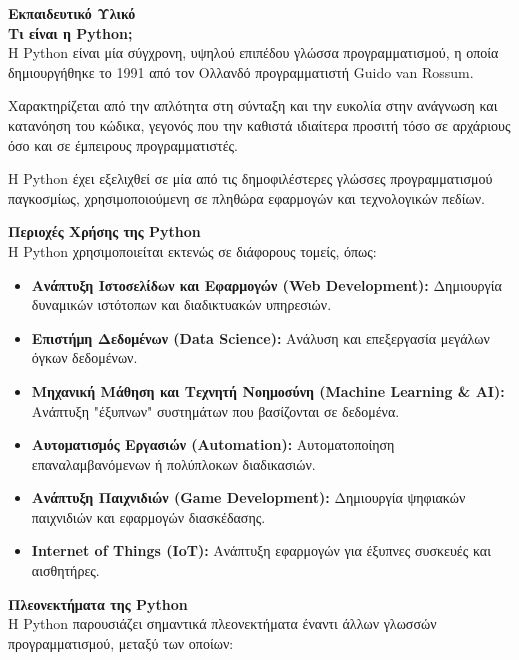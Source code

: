 \documentclass[11pt]{report}
\begin{document}
\vspace{1em}
\textbf{Εκπαιδευτικό Υλικό} \\

\vspace{0.5em}
\textbf{Τι είναι η Python;} \\[0.5em]
Η Python είναι μία σύγχρονη, υψηλού επιπέδου γλώσσα προγραμματισμού, η οποία δημιουργήθηκε το 1991 από τον Ολλανδό προγραμματιστή Guido van Rossum.

Χαρακτηρίζεται από την απλότητα στη σύνταξη και την ευκολία στην ανάγνωση και κατανόηση του κώδικα, γεγονός που την καθιστά ιδιαίτερα προσιτή τόσο σε αρχάριους όσο και σε έμπειρους προγραμματιστές.

Η Python έχει εξελιχθεί σε μία από τις δημοφιλέστερες γλώσσες προγραμματισμού παγκοσμίως, χρησιμοποιούμενη σε πληθώρα εφαρμογών και τεχνολογικών πεδίων.

\vspace{1em}
\textbf{Περιοχές Χρήσης της Python} \\[0.5em]
Η Python χρησιμοποιείται εκτενώς σε διάφορους τομείς, όπως:

\begin{itemize}
    \item \textbf{Ανάπτυξη Ιστοσελίδων και Εφαρμογών (Web Development):} Δημιουργία δυναμικών ιστότοπων και διαδικτυακών υπηρεσιών.
    \item \textbf{Επιστήμη Δεδομένων (Data Science):} Ανάλυση και επεξεργασία μεγάλων όγκων δεδομένων.
    \item \textbf{Μηχανική Μάθηση και Τεχνητή Νοημοσύνη (Machine Learning \& AI):} Ανάπτυξη "έξυπνων" συστημάτων που βασίζονται σε δεδομένα.
    \item \textbf{Αυτοματισμός Εργασιών (Automation):} Αυτοματοποίηση επαναλαμβανόμενων ή πολύπλοκων διαδικασιών.
    \item \textbf{Ανάπτυξη Παιχνιδιών (Game Development):} Δημιουργία ψηφιακών παιχνιδιών και εφαρμογών διασκέδασης.
    \item \textbf{Internet of Things (IoT):} Ανάπτυξη εφαρμογών για έξυπνες συσκευές και αισθητήρες.
\end{itemize}

\vspace{1em}
\textbf{Πλεονεκτήματα της Python} \\[0.5em]
Η Python παρουσιάζει σημαντικά πλεονεκτήματα έναντι άλλων γλωσσών προγραμματισμού, μεταξύ των οποίων:
\end{document}
